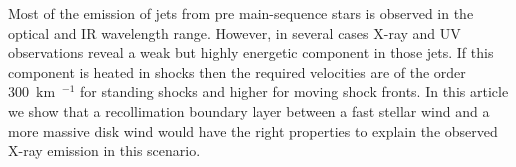Most of the emission of jets from pre main-sequence stars is observed in the optical and IR wavelength range. However, in several cases X-ray and UV observations reveal a weak but highly energetic component in those jets. If this component is heated in shocks then the required velocities are of the order 300~km~$^{-1}$ for standing shocks and higher for moving shock fronts. In this article we show that a recollimation boundary layer between a fast stellar wind and a more massive disk wind would have the right properties to explain the observed X-ray emission in this scenario.
